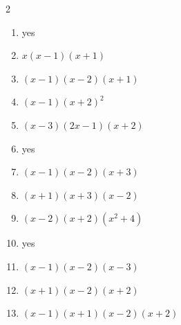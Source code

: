 \documentclass[11pt]{article}
\begin{document}
\begin{keybox}
\begin{multicols}{2}
\small
\begin{enumerate}[leftmargin=*,itemsep=3pt]
  \item yes
  \item $x(x-1)(x+1)$
  \item $(x-1)(x-2)(x+1)$
  \item $(x-1)(x+2)^2$
  \item $(x-3)(2x-1)(x+2)$
  \item yes
  \item $(x-1)(x-2)(x+3)$
  \item $(x+1)(x+3)(x-2)$
  \item $(x-2)(x+2)(x^2+4)$
  \item yes
  \item $(x-1)(x-2)(x-3)$
  \item $(x+1)(x-2)(x+2)$
  \item $(x-1)(x+1)(x-2)(x+2)$
\end{enumerate}
\end{multicols}
\end{keybox}
\end{document}
